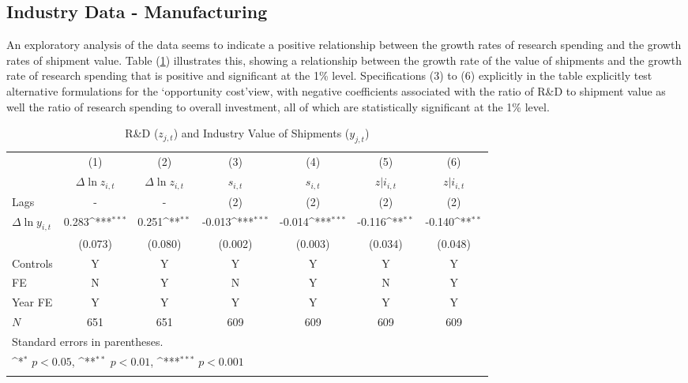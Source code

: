 \documentclass{_latex/house}
\begin{document}
\subsection{Industry Data - Manufacturing} \label{datamanufacturing}
An exploratory analysis of the data seems to indicate a positive relationship between the growth rates of research spending and the growth rates of shipment value. Table (\ref{tab:table5}) illustrates this, showing a relationship between the growth rate of the value of shipments and the growth rate of research spending that is positive and significant at the 1\% level. Specifications (3) to (6) explicitly in the table explicitly test alternative formulations for the \textquoteleft opportunity cost\textquoteright\:view, with negative coefficients associated with the ratio of R\&D to shipment value as well the ratio of research spending to overall investment, all of which are statistically significant at the 1\% level.
\begin{table}[h!t]\footnotesize
\caption{R\&D ($z_{j,t}$) and Industry Value of Shipments ($y_{j,t}$)}
\begin{center}
{
\def\sym#1{\ifmmode^{#1}\else\(^{#1}\)\fi}
\begin{tabular}{l*{6}{c}}
\hline\hline
            &\multicolumn{1}{c}{(1)}&\multicolumn{1}{c}{(2)}&\multicolumn{1}{c}{(3)}&\multicolumn{1}{c}{(4)}&\multicolumn{1}{c}{(5)}&\multicolumn{1}{c}{(6)}\\
            &\multicolumn{1}{c}{$\Delta \ln{z_{i,t}}$}&\multicolumn{1}{c}{$\Delta \ln{z_{i,t}}$}&\multicolumn{1}{c}{$s_{i,t}$}&\multicolumn{1}{c}{$s_{i,t}$}&\multicolumn{1}{c}{$z|i_{i,t}$}&\multicolumn{1}{c}{$z|i_{i,t}$}\\
\hline
Lags & - & - & (2) & (2) & (2) & (2) \\
$\Delta \ln{y_{i,t}}$ &       0.283\sym{***}  &       0.251\sym{**}         &     -0.013\sym{***}&     -0.014\sym{***}  &     -0.116\sym{**}&    -0.140\sym{**} \\
&     (0.073)         &     (0.080)         &     (0.002)         &     (0.003)         &     (0.034)         &     (0.048)         \\
Controls & Y & Y & Y & Y & Y & Y \\
FE & N & Y & N & Y & N & Y \\
Year FE & Y & Y & Y & Y & Y & Y \\
\hline
\(N\) & 651 & 651 & 609 & 609 & 609 & 609 \\
\hline\hline
\multicolumn{7}{l}{\footnotesize Standard errors in parentheses.}\\
\multicolumn{7}{l}{\footnotesize \sym{*} \(p<0.05\), \sym{**} \(p<0.01\), \sym{***} \(p<0.001\)}\\
\label{tab:table5}
\end{tabular}
}
\end{center}
\end{table}
\end{document}
